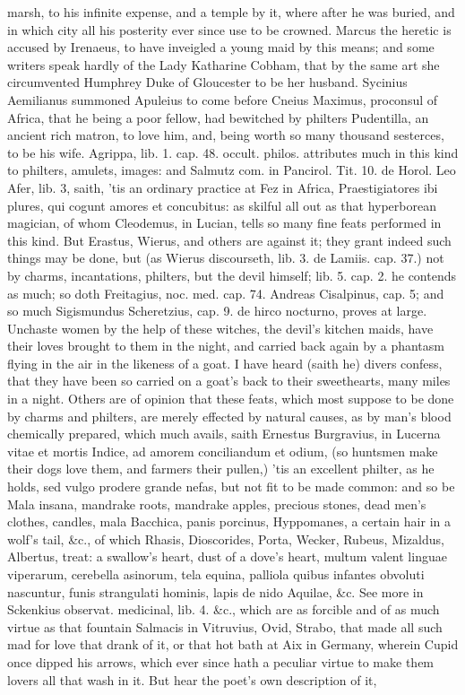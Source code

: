 {marsh, to his infinite expense, and a temple by it, where after
he was buried, and in which city all his posterity ever since use to be
crowned. Marcus the heretic is accused by Irenaeus, to have inveigled a
young maid by this means; and some writers speak hardly of the Lady
Katharine Cobham, that by the same art she circumvented Humphrey Duke
of Gloucester to be her husband. Sycinius Aemilianus summoned
Apuleius to come before Cneius Maximus, proconsul of Africa, that
he being a poor fellow, had bewitched by philters Pudentilla, an
ancient rich matron, to love him, and, being worth so many thousand
sesterces, to be his wife. Agrippa, lib. 1. cap. 48. occult. philos.
attributes much in this kind to philters, amulets, images: and Salmutz
com. in Pancirol. Tit. 10. de Horol. Leo Afer, lib. 3, saith, 'tis an
ordinary practice at Fez in Africa, Praestigiatores ibi plures, qui
cogunt amores et concubitus: as skilful all out as that hyperborean
magician, of whom Cleodemus, in  Lucian, tells so many fine feats
performed in this kind. But Erastus, Wierus, and others are against it;
they grant indeed such things may be done, but (as Wierus discourseth,
lib. 3. de Lamiis. cap. 37.) not by charms, incantations, philters, but
the devil himself; lib. 5. cap. 2. he contends as much; so doth
Freitagius, noc. med. cap. 74. Andreas Cisalpinus, cap. 5; and so much
Sigismundus Scheretzius, cap. 9. de hirco nocturno, proves at large.
Unchaste women by the help of these witches, the devil's kitchen
maids, have their loves brought to them in the night, and carried back
again by a phantasm flying in the air in the likeness of a goat. I have
heard (saith he) divers confess, that they have been so carried on a
goat's back to their sweethearts, many miles in a night. Others are of
opinion that these feats, which most suppose to be done by charms and
philters, are merely effected by natural causes, as by man's blood
chemically prepared, which much avails, saith Ernestus Burgravius, in
Lucerna vitae et mortis Indice, ad amorem conciliandum et odium, (so
huntsmen make their dogs love them, and farmers their pullen,) 'tis an
excellent philter, as he holds, sed vulgo prodere grande nefas, but not
fit to be made common: and so be Mala insana, mandrake roots, mandrake
apples, precious stones, dead men's clothes, candles, mala
Bacchica, panis porcinus, Hyppomanes, a certain hair in a wolf's
tail, \&c., of which Rhasis, Dioscorides, Porta, Wecker, Rubeus,
Mizaldus, Albertus, treat: a swallow's heart, dust of a dove's heart,
multum valent linguae viperarum, cerebella asinorum, tela equina,
palliola quibus infantes obvoluti nascuntur, funis strangulati hominis,
lapis de nido Aquilae, \&c. See more in Sckenkius observat. medicinal,
lib. 4. \&c., which are as forcible and of as much virtue as that
fountain Salmacis in  Vitruvius, Ovid, Strabo, that made all such
mad for love that drank of it, or that hot bath at Aix in
Germany, wherein Cupid once dipped his arrows, which ever since hath a
peculiar virtue to make them lovers all that wash in it. But hear the
poet's own description of it,

}
